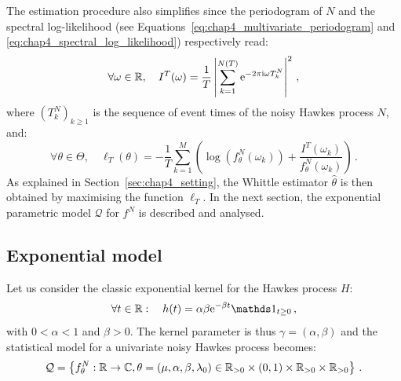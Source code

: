           The estimation procedure also simplifies since
          the periodogram of $N$ and the spectral log-likelihood (see Equations~\eqref{eq:chap4_multivariate_periodogram} and \eqref{eq:chap4_spectral_log_likelihood}) respectively read:
          \[
            \forall \omega \in {\mathbb R}, \quad
            I^T(\omega) = \frac{1}{T}\left\lvert \sum_{k=1}^{N(T)}{\mathrm{e}^{-2\pi \mathrm{i} \omega T_k^N}}\right\rvert^2\,,
          \]
          where $(T_k^{N})_{k\geq1}$ is the sequence of event times of the noisy Hawkes process $N$,
          and:
          \begin{equation}\label{eq:chap4_univariate_log_likelihood}
            \forall \theta \in \Theta, \quad
          	\ell_T(\theta) = -\frac{1}{T}\sum_{k=1}^{M}{\left(\log\left(f_\theta^N(\omega_k)\right) + \frac{I^T(\omega_k)}{f_\theta^N(\omega_k)}\right)}\,.
		      \end{equation}
          As explained in Section~\ref{sec:chap4_setting}, the Whittle estimator $\hat \theta$ is then obtained by maximising the function $\ell_T$.
          In the next section, the exponential parametric model $\mathcal Q$ for $f^N$ is described and analysed.


      \subsection{Exponential model}\label{sec:chap4_expon_1d}
        Let us consider the classic exponential kernel for the Hawkes process $H$:
          \begin{equation}\label{eq:chap4_exp_kernel_1d}
            \forall t \in \RR: \quad
            h(t) = \alpha\beta \mathrm{e}^{-\beta t} \II_{t \ge 0}\,,
          \end{equation}
          with $0 < \alpha < 1$ and $\beta > 0$.
          The kernel parameter is thus $\gamma = (\alpha, \beta)$ and the statistical model for a univariate noisy Hawkes process becomes:
          \[
        		\mathcal Q = \left\{
        		  f^N_\theta : {\mathbb R} \to \mathbb C, 
              \theta = (\mu, \alpha, \beta, \lambda_0) \in {\mathbb R}_{>0}\times (0,1) \times {\mathbb R}_{>0} \times {\mathbb R}_{>0}
            \right\}\,.
          \]
          
